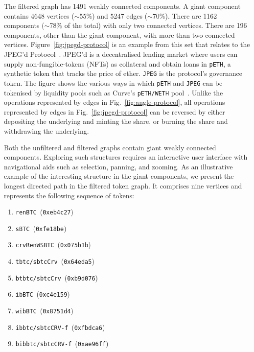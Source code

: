 The filtered graph has \num{1491} weakly connected components.  A
giant component contains \num{4648} vertices ($\sim$\num{55}\%) and
\num{5247} edges ($\sim$\num{70}\%).  There are \num{1162} components
($\sim$\num{78}\% of the total) with only two connected vertices.
There are \num{196} components, other than the giant component, with
more than two connected vertices.  Figure~\ref{fig:jpegd-protocol} is
an example from this set that relates to the JPEG'd
Protocol~\cite{jpegd-xx}.  JPEG'd is a decentralised lending market
where users can supply non-fungible-tokens (NFTs) as collateral and
obtain loans in \texttt{pETH}, a synthetic token that tracks the price
of ether. \texttt{JPEG} is the protocol's governance token.  The
figure shows the various ways in which \texttt{pETH} and \texttt{JPEG}
can be tokenised by liquidity pools such as Curve's \texttt{pETH/WETH}
pool~\cite{curve-finance-xx}. Unlike the operations represented by
edges in Fig.~\ref{fig:angle-protocol}, all operations represented by
edges in Fig.~\ref{fig:jpegd-protocol} can be reversed by either
depositing the underlying and minting the share, or burning the share
and withdrawing the underlying.

Both the unfiltered and filtered graphs contain giant weakly connected
components.  Exploring such structures requires an interactive user
interface with navigational aids such as selection, panning, and
zooming.  As an illustrative example of the interesting structure in
the giant components, we present the longest directed path in the
filtered token graph.  It comprises nine vertices and represents the
following sequence of tokens:

\begin{enumerate}
\item \texttt{renBTC}~(\texttt{0xeb4c27})
\item \texttt{sBTC}~(\texttt{0xfe18be})
\item \texttt{crvRenWSBTC}~(\texttt{0x075b1b})
\item \texttt{tbtc/sbtcCrv}~(\texttt{0x64eda5})
\item \texttt{btbtc/sbtcCrv}~(\texttt{0xb9d076})
\item \texttt{ibBTC}~(\texttt{0xc4e159})
\item \texttt{wibBTC}~(\texttt{0x8751d4})
\item \texttt{ibbtc/sbtcCRV-f}~(\texttt{0xfbdca6})
\item \texttt{bibbtc/sbtcCRV-f}~(\texttt{0xae96ff})
\end{enumerate}

